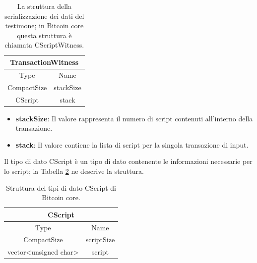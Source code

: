 \begin{table}[H]
       \centering\small
           \begin{tabular}{|c|c|}
               \hline
                 \multicolumn{2}{|c|}{\textbf{TransactionWitness}} \\
                 \hline
                 \multicolumn{1}{|c|}{Type} & \multicolumn{1}{c|}{Name} \\
               \hline \hline
               CompactSize & stackSize   \\
               \hline
               CScript & stack \\
               \hline
       \end{tabular}
       \caption{La struttura della serializzazione dei dati del testimone; in Bitcoin core questa struttura è chiamata CScriptWitness.\label{tab:witnesstxbitcoinc}}
   \end{table}

\begin{itemize}
  \item {\bf stackSize\/}: Il valore rappresenta il numero di script contenuti all’interno della transazione.
  \item {\bf stack\/}: Il valore contiene la lista di script per la singola transazione di input.
\end{itemize}
\leavevmode
\newline
Il tipo di dato CScript è un tipo di dato contenente le informazioni necessarie per lo script; la Tabella \ref{tab:scriptbitcoinc} ne descrive la struttura.


\begin{table}
       \centering\small
           \begin{tabular}{|c|c|}
               \hline
                 \multicolumn{2}{|c|}{\textbf{CScript}} \\
                 \hline
                 \multicolumn{1}{|c|}{Type} & \multicolumn{1}{c|}{Name} \\
               \hline \hline
               CompactSize & scriptSize   \\
               \hline
               vector<unsigned char> & script \\
               \hline
       \end{tabular}
       \caption{Struttura del tipi di dato CScript di Bitcoin core.\label{tab:scriptbitcoinc}}
   \end{table}

